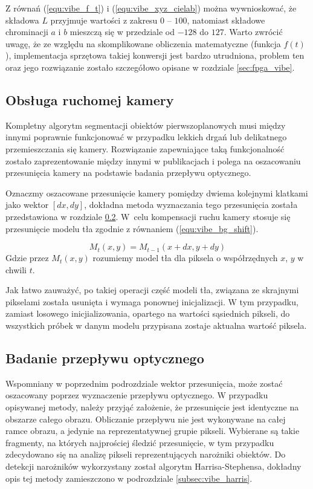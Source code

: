 Z równań (\ref{equ:vibe_f_t}) i (\ref{equ:vibe_xyz_cielab}) można wywnioskować, że składowa $L$ przyjmuje wartości z zakresu $0$ -- $100$, natomiast składowe chrominacji $a$ i $b$ mieszczą się w przedziale od $-128$ do $127$. Warto zwrócić uwagę, że ze względu na skomplikowane obliczenia matematyczne (funkcja $f(t)$), implementacja sprzętowa takiej konwersji jest bardzo utrudniona, problem ten oraz jego rozwiązanie zostało szczegółowo opisane w rozdziale \ref{sec:fpga_vibe}.

\subsection{Obsługa ruchomej kamery}
\label{subsec:vibe_ruchoma_kamera}

Kompletny algorytm segmentacji obiektów pierwszoplanowych musi między innymi poprawnie funkcjonować w przypadku lekkich drgań lub delikatnego przemieszczania się kamery. Rozwiązanie zapewniające taką funkcjonalność zostało zaprezentowanie między innymi w publikacjach \cite{} i polega na oszacowaniu przesunięcia kamery na podstawie badania przepływu optycznego.

Oznaczmy oszacowane przesunięcie kamery pomiędzy dwiema kolejnymi klatkami jako wektor $[dx,dy]$, dokładna metoda wyznaczania tego przesunięcia została przedstawiona w rozdziale \ref{subsec:vibe_of}. W~celu kompensacji ruchu kamery stosuje się przesunięcie modelu tła zgodnie z równaniem (\ref{equ:vibe_bg_shift}).

	\begin{equation}
	M_t(x,y) = M_{t-1}(x+dx,y+dy)
	\label{equ:vibe_bg_shift}
	\end{equation}
Gdzie przez $M_t(x,y)$ rozumiemy model tła dla piksela o współrzędnych $x$, $y$ w chwili $t$.


Jak łatwo zauważyć, po takiej operacji część modeli tła, związana ze skrajnymi pikselami została usunięta i wymaga ponownej inicjalizacji. W tym przypadku, zamiast losowego inicjializowania, opartego na wartości sąsiednich pikseli, do wszystkich próbek w danym modelu przypisana zostaje aktualna wartość piksela.

\subsection{Badanie przepływu optycznego}
\label{subsec:vibe_of}

Wspomniany w poprzednim podrozdziale wektor przesunięcia, może zostać oszacowany poprzez wyznaczenie przepływu optycznego. W przypadku opisywanej metody, należy przyjąć założenie, że przesunięcie jest identyczne na obszarze całego obrazu. Obliczanie przepływu nie jest wykonywane na całej ramce obrazu, a jedynie na reprezentatywnej grupie pikseli. Wybierane są takie fragmenty, na których najprościej śledzić przesunięcie, w tym przypadku zdecydowano się na analizę pikseli reprezentujących narożniki obiektów. Do detekcji narożników wykorzystany został algorytm Harrisa-Stephensa, dokładny opis tej metody zamieszczono w podrozdziale \ref{subsec:vibe_harris}.

